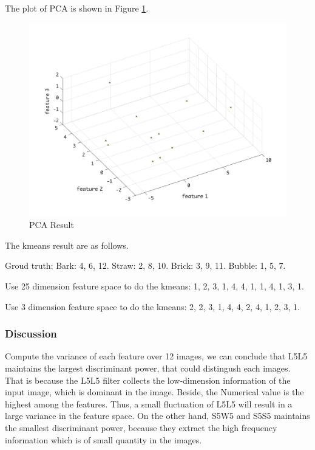 \documentclass[11pt]{article}
\begin{document}
The plot of PCA is shown in Figure \ref{pca_3d}.
\begin{figure}[!htp]
	\centering
	\includegraphics[scale=0.3]{pca_3d.png}
	\caption{PCA Result}
	\label{pca_3d}
	\end{figure}
\par
The kmeans result are as follows.\par

Groud truth: Bark: 4, 6, 12. Straw: 2, 8, 10. Brick: 3, 9, 11. Bubble: 1, 5, 7.\par
Use 25 dimension feature space to do the kmeans: 1, 2, 3, 1, 4, 4, 1, 1, 4, 1, 3, 1.\par
Use 3 dimension feature space to do the kmeans: 2, 2, 3, 1, 4, 4, 2, 4, 1, 2, 3, 1. \par
\subsubsection{Discussion}

Compute the variance of each feature over 12 images, we can conclude that L5L5 maintains the largest discriminant power, that could distingush each images. That is because the L5L5 filter collects the low-dimension information of the input image, which is dominant in the image. Beside, the Numerical value is the highest among the features. Thus, a small fluctuation of L5L5 will result in a large variance in the feature space. On the other hand, S5W5 and S5S5 maintains the smallest discriminant power, because they extract the high frequency information which is of small quantity in the images. \par
\end{document}
